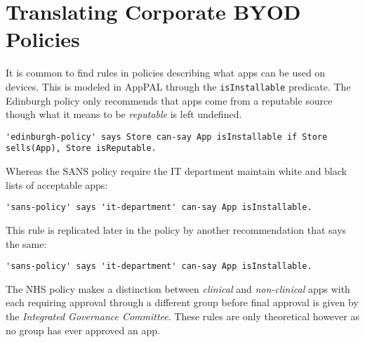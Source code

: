 \documentclass{easychair}
\begin{document}

\section{Translating Corporate BYOD Policies}
\label{sec:translation}

It is common to find rules in policies describing what apps can be used on devices.
This is modeled in AppPAL through the \texttt{isInstallable} predicate.
The Edinburgh policy only recommends that apps come from a reputable source though what it means to be \emph{reputable} is left undefined. 
\begin{lstlisting}[title={\footnotesize\textbf{Edinburgh}:~\itshape ``Only download applications (‘apps’) or other software from reputable sources.''}]
'edinburgh-policy' says Store can-say App isInstallable if Store sells(App), Store isReputable.
\end{lstlisting}
Whereas the SANS policy require the IT department maintain white and black lists of acceptable apps:
\begin{lstlisting}[title={\footnotesize\textbf{SANS}:~\itshape ``The IT Department maintains a list of allowed and unauthorzed applications and makes them available to users on the intranet.''}]
'sans-policy' says 'it-department' can-say App isInstallable.
\end{lstlisting}
This rule is replicated later in the policy by another recommendation that says the same:
\begin{lstlisting}[title={\footnotesize\textbf{SANS}:~\itshape ``Only approved third party applications can be
installed on handhelds. The approved list can be
obtained by contacting the IT department, or should be
available on the intranet.''}]
'sans-policy' says 'it-department' can-say App isInstallable.
\end{lstlisting}
The NHS policy makes a distinction between \emph{clinical} and \emph{non-clinical} apps with each requiring approval through a different group before final approval is given by the \emph{Integrated Governance Committee}.  These rules are only theoretical however as no group has ever approved an app.
\end{document}
